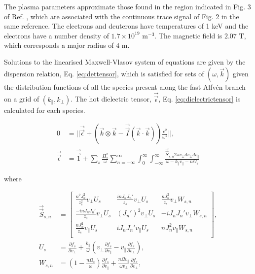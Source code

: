 \documentclass[12pt]{iopart}
\begin{document}
The plasma parameters approximate those found in the region indicated in Fig. 3
of Ref. \cite{Cottrell1993}, which are associated with the continuous trace
signal of Fig. 2 in the same reference. The electrons and deuterons have
temperatures of 1 keV and the electrons have a number density
of $1.7\times 10^{19}$ $\mathrm{m^{-3}}$. The magnetic field is $2.07$
$\mathrm{T}$, which corresponds a major radius of $4$ m.

Solutions to the linearised Maxwell-Vlasov system of equations are given by the
dispersion relation, Eq. \ref{eq:dettensor}, which is satisfied for sets of
$(\omega,\vec{k})$ given the distribution functions of all the species present
along the fast Alfv{\'e}n branch  on a grid of $(k_\parallel, k_\bot)$.
The hot dielectric tensor\cite{Stix}, $\vec{\vec{\epsilon}}$, Eq. \ref{eq:dielectrictensor} is calculated for each species.

\begin{align}
    0 &= ||\vec{\vec{\epsilon}} + \left(\vec{k} \otimes \vec{k} - \vec{\vec{I}}(\vec{k}\cdot\vec{k})\right) \frac{c^2}{\omega^2}||,\label{eq:dettensor}\\
    \vec{\vec{\epsilon}} &= \vec{\vec{1}} + \sum_s \frac{\Pi_s^2}{\omega}\sum_{n=-\infty}^{\infty}
    \int_0^{\infty}
    \int_{-\infty}^{\infty}\frac{\vec{\vec{S}}_{s,n} 2\pi v_\perp dv_\perp dv_\parallel}{\omega - k_\parallel v_\parallel - n \Omega_s}
    \label{eq:dielectrictensor}
\end{align}

\noindent where

\begin{align}
\vec{\vec{S}}_{s,n} &=
\begin{bmatrix}
\frac{n^2J_n^2}{z_s^2}v_\perp U_s & \frac{inJ_nJ_n'}{z_s}v_\perp U_s & \frac{n
  J_n^2}{z_s} v_\perp W_{s,n} \\
\frac{-inJ_nJ_n'}{z_s}v_\perp U_s & (J_n')^2 v_\perp U_s & -iJ_n J_n' v_\perp
  W_{s,n} \\
\frac{nJ_n^2}{z_s}v_\parallel U_s & iJ_nJ_n'v_\parallel U_s & n J_n^2
  v_\parallel W_{s,n} \\
\end{bmatrix}\label{eq:stenor},\\
U_s &= \frac{\partial f_s}{\partial v_\perp} + \frac{k_\parallel}{\omega}  \left(v_\perp \frac{\partial f_s}{\partial v_\parallel} - v_\parallel \frac{\partial f_s}{\partial v_\perp}\right)\label{eq:uterm},\\
  W_{s,n} &=\left(1- \frac{n\Omega_s}{\omega}\right)\frac{\partial f_s}{\partial v_\parallel} + \frac{n\Omega v_\parallel}{\omega v_\perp}\frac{\partial f_s}{\partial v_\perp}\label{eq:wterm},
\end{align}
\end{document}
